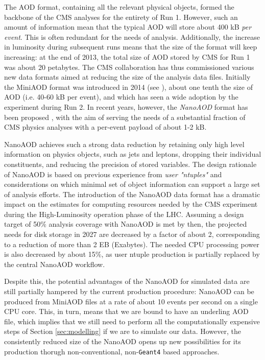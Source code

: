 The AOD format, containing all the relevant physical objects, formed the backbone of the CMS analyses for the entirety of Run 1. However, such an amount of information mean that the typical AOD will store about 400 kB \emph{per event}. This is often redundant for the needs of analysis. Additionally, the increase in luminosity during subsequent runs means that the size of the format will keep increasing: at the end of 2013, the total size of AOD stored by CMS for Run 1 was about 20 petabytes. The CMS collaboration has thus commissioned various new data formats aimed at reducing the size of the analysis data files.
Initially the MiniAOD format was introduced in 2014 (see \cite{Petrucciani_2015}), about one tenth the size of AOD (i.e. 40-60 kB per event), and which has seen a wide adoption by the experiment during Run 2. In recent years, however, the \emph{NanoAOD} format has been proposed \cite{Peruzzi_2020}, with the aim of serving the needs of a substantial fraction of CMS physics analyses with a per-event payload of about 1-2 kB.

NanoAOD achieves such a strong data reduction by retaining only high level information on physics objects, such as jets and leptons, dropping their individual constituents, and reducing the precision of stored variables.
The design rationale of NanoAOD is based on previous experience from \emph{user "ntuples"} and considerations on which minimal set of object information can support a large set of analysis efforts. The introduction of the NanoAOD data format has a dramatic impact on the estimates for computing resources needed by the CMS experiment during the High-Luminosity operation phase of the LHC. Assuming a design target of 50$\%$ analysis coverage with NanoAOD is met by then, the projected needs for disk storage in 2027 are decreased by a factor of about 2, corresponding to a reduction of more than 2 EB (Exabytes). The needed CPU processing power is also decreased by about 15$\%$, as user ntuple production is partially replaced by the central NanoAOD workflow.

Despite this, the potential advantages of the NanoAOD for simulated data are still partially hampered by the current production procedure: NanoAOD can be produced from MiniAOD files at a rate of about 10 events per second on a
single CPU core. This, in turn, means that we are bound to have an underling AOD file, which implies that we still need to perform all the computationally expensive steps of Section \ref{sec:modelling} if we are to simulate our data.
However, the consistently reduced size of the NanoAOD opens up new possibilities for its production thorugh non-conventional, non-\texttt{Geant4} based approaches. 

